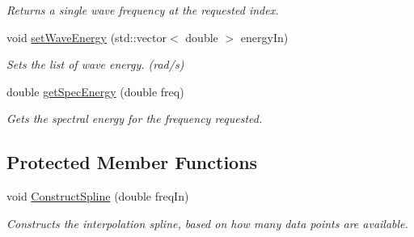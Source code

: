 \begin{DoxyCompactItemize}
\begin{DoxyCompactList}\small\item\em Returns a single wave frequency at the requested index. \end{DoxyCompactList}\item 
void \hyperlink{classosea_1_1_wave_spec_a0ce0af01b4afa934b1ce4fa10ea892d6}{set\-Wave\-Energy} (std\-::vector$<$ double $>$ energy\-In)
\begin{DoxyCompactList}\small\item\em Sets the list of wave energy. (rad/s) \end{DoxyCompactList}\item 
double \hyperlink{classosea_1_1_wave_spec_a2fcca343c95ac41cc282e825f2c33cb5}{get\-Spec\-Energy} (double freq)
\begin{DoxyCompactList}\small\item\em Gets the spectral energy for the frequency requested. \end{DoxyCompactList}\end{DoxyCompactItemize}
\subsection*{Protected Member Functions}
\begin{DoxyCompactItemize}
\item 
void \hyperlink{classosea_1_1_wave_spec_ac76583847ab29ca9e8855c3236a66d17}{Construct\-Spline} (double freq\-In)
\begin{DoxyCompactList}\small\item\em Constructs the interpolation spline, based on how many data points are available. \end{DoxyCompactList}\end{DoxyCompactItemize}
